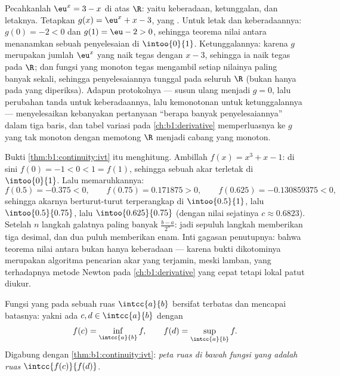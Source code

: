 \begin{example}\label{ex:b1:continuity:protocol}
Pecahkanlah $\eu^x = 3 - x$ di atas $\R$: yaitu keberadaan, ketunggalan, dan
letaknya. Tetapkan $g(x) = \eu^x + x - 3$, yang . Untuk letak dan
keberadaannya: $g(0) = -2 < 0$ dan $g(1) = \eu - 2 > 0$, sehingga
teorema nilai antara menanamkan sebuah penyelesaian di
$\intoo{0}{1}$. Ketunggalannya: karena $g$ merupakan jumlah $\eu^x$ yang
naik tegas dengan $x - 3$, sehingga ia naik tegas pada
$\R$; dan fungsi yang monoton tegas mengambil setiap nilainya paling banyak
sekali, sehingga penyelesaiannya tunggal pada seluruh $\R$ (bukan hanya pada
 yang diperiksa). Adapun protokolnya --- susun ulang menjadi $g = 0$, lalu perubahan
tanda untuk keberadaannya, lalu kemonotonan untuk ketunggalannya --- menyelesaikan
kebanyakan pertanyaan ``berapa banyak penyelesaiannya'' dalam tiga baris, dan
tabel variasi pada \cref{ch:b1:derivative}
memperluasnya ke $g$ yang tak monoton dengan memotong $\R$ menjadi cabang
yang monoton.
\end{example}

\begin{example}\label{ex:b1:continuity:dichotomy}
Bukti \cref{thm:b1:continuity:ivt} itu menghitung. Ambillah $f(x) =
x^3 + x - 1$: di sini $f(0) = -1 < 0 < 1 = f(1)$, sehingga sebuah akar terletak di
$\intoo{0}{1}$. Lalu memaruhkannya:
\[
f(0.5) = -0.375 < 0, \qquad
f(0.75) = 0.171875 > 0, \qquad
f(0.625) = -0.130859375 < 0 ,
\]
sehingga akarnya berturut-turut terperangkap di $\intoo{0.5}{1}$, lalu
$\intoo{0.5}{0.75}$, lalu $\intoo{0.625}{0.75}$ (dengan nilai sejatinya
$c \approx 0.6823$). Setelah $n$ langkah galatnya paling banyak
$\frac{b - a}{2^n}$: jadi sepuluh langkah memberikan tiga desimal, dan dua puluh memberikan
enam. Inti gagasan penutupnya: bahwa teorema nilai antara bukan
hanya  keberadaan --- karena bukti dikotominya merupakan
algoritma pencarian akar yang terjamin, meski lamban, yang terhadapnya
metode Newton pada \cref{ch:b1:derivative} yang cepat tetapi lokal patut
diukur.
\end{example}

\begin{theorem}\label{thm:b1:continuity:evt}
Fungsi yang  pada sebuah ruas $\intcc{a}{b}$ bersifat terbatas dan
mencapai batasnya: yakni ada $c, d \in \intcc{a}{b}$ dengan
\[
f(c) = \inf_{\intcc{a}{b}} f,
\qquad
f(d) = \sup_{\intcc{a}{b}} f .
\]
Digabung dengan \cref{thm:b1:continuity:ivt}: \emph{peta ruas
di bawah fungsi yang  adalah ruas} $\intcc{f(c)}{f(d)}$.
\end{theorem}

